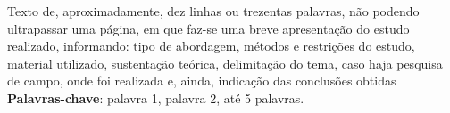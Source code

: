 \begin{resumo}
Texto de, aproximadamente, dez linhas ou trezentas palavras, não podendo ultrapassar uma página, em que faz-se uma breve apresentação do estudo realizado, informando: tipo de abordagem, métodos e restrições do estudo, material utilizado, sustentação teórica, delimitação do tema, caso haja pesquisa de campo, onde foi realizada e, ainda, indicação das conclusões obtidas\\
 \textbf{Palavras-chave}: palavra 1, palavra 2, até 5 palavras.
\end{resumo}